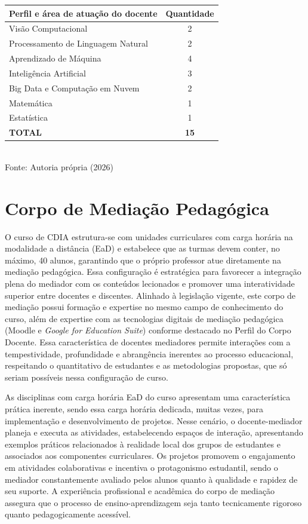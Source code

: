 \begin{quadro}[ht]
\caption{Previsão de contratação docente por área do curso}
\label{quadro3.6}
\centering
\begin{tabular}{|p{8cm}|c|}
\hline
\textbf{Perfil e área de atuação do docente} & \textbf{Quantidade} \\ \hline
Visão Computacional & 2 \\ \hline
Processamento de Linguagem Natural & 2 \\ \hline
Aprendizado de Máquina & 4 \\ \hline
Inteligência Artificial & 3 \\ \hline
Big Data e Computação em Nuvem & 2 \\ \hline
Matemática & 1 \\ \hline
Estatística & 1 \\ \hline
\textbf{TOTAL} & \textbf{15} \\ \hline
\end{tabular}
\small \\ Fonte: Autoria própria (2026)
\end{quadro}

\section{Corpo de Mediação Pedagógica}

O curso de CDIA estrutura-se com unidades curriculares com carga horária na modalidade a distância (EaD) e estabelece que as turmas devem conter, no máximo, 40 alunos, garantindo que o próprio professor atue diretamente na mediação pedagógica. Essa configuração é estratégica para favorecer a integração plena do mediador com os conteúdos lecionados e promover uma interatividade superior entre docentes e discentes. Alinhado à legislação vigente, este corpo de mediação possui formação e expertise no mesmo campo de conhecimento do curso, além de expertise com as tecnologias digitais de mediação pedagógica (Moodle e \textit{Google for Education Suite}) conforme destacado no Perfil do Corpo Docente. Essa característica de docentes mediadores permite interações com a tempestividade, profundidade e abrangência inerentes ao processo educacional, respeitando o quantitativo de estudantes e as metodologias propostas, que só seriam possíveis nessa configuração de curso.

As disciplinas com carga horária EaD do curso apresentam uma característica prática inerente, sendo essa carga horária dedicada, muitas vezes, para implementação e desenvolvimento de projetos. Nesse cenário, o docente-mediador planeja e executa as atividades, estabelecendo espaços de interação, apresentando exemplos práticos relacionados à realidade local dos grupos de estudantes e associados aos componentes curriculares. Os projetos promovem o engajamento em atividades colaborativas e incentiva o protagonismo estudantil, sendo o mediador constantemente avaliado pelos alunos quanto à qualidade e rapidez de seu suporte. A experiência profissional e acadêmica do corpo de mediação assegura que o processo de ensino-aprendizagem seja tanto tecnicamente rigoroso quanto pedagogicamente acessível.


